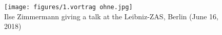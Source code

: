 \documentclass[output=paper,colorlinks,citecolor=brown]{langscibook}
\begin{document}
\begin{otherlanguage}{german}

\sloppy
\printbibliography[heading=subbibliography,notkeyword=this]

\vfill
\begin{figure}
    \texttt{[image: figures/1.vortrag ohne.jpg]}\\
    {\small Ilse Zimmermann giving a talk at the Leibniz-ZAS, Berlin (June 16, 2018)}%
\end{figure}

\end{otherlanguage}
\end{document}
